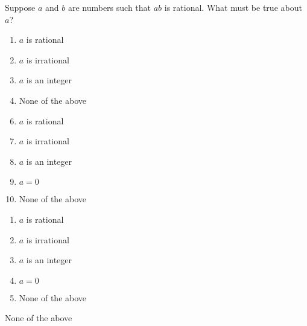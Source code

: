 


 Suppose $a$ and $b$ are numbers such that $ab$ is rational. What must be true about $a$?


\ifsat
	\begin{enumerate}[label=\Alph*)]
		\item   $a$ is rational 
		\item  $a$ is irrational
		\item  $a$ is an integer
		\item   None of the above %
	\end{enumerate}
\else
\fi

\ifacteven
	\begin{enumerate}[label=\textbf{\Alph*.},itemsep=\fill,align=left]
		\setcounter{enumii}{5}
		\item   $a$ is rational 
		\item  $a$ is irrational
		\item  $a$ is an integer
		\addtocounter{enumii}{1}
		\item  $a=0$
		\item   None of the above %
	\end{enumerate}
\else
\fi

\ifactodd
	\begin{enumerate}[label=\textbf{\Alph*.},itemsep=\fill,align=left]
		\item   $a$ is rational 
		\item  $a$ is irrational
		\item  $a$ is an integer
		\item  $a=0$
		\item   None of the above %
	\end{enumerate}
\else
\fi

\ifgridin
   None of the above %

\else
\fi

